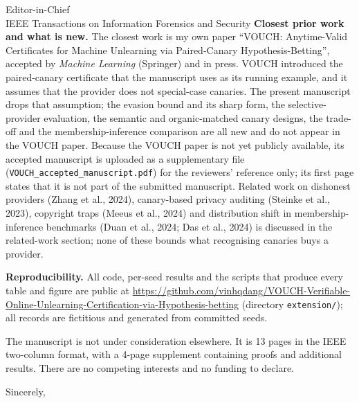 \documentclass[11pt]{letter}
\begin{document}
\begin{letter}{Editor-in-Chief\\IEEE Transactions on Information Forensics and Security}
\textbf{Closest prior work and what is new.} The closest work is my own paper
``VOUCH: Anytime-Valid Certificates for Machine Unlearning via Paired-Canary
Hypothesis-Betting'', accepted by \emph{Machine Learning} (Springer) and in press. VOUCH
introduced the paired-canary certificate that the manuscript uses as its running example,
and it assumes that the provider does not special-case canaries. The present manuscript drops
that assumption; the evasion bound and its sharp form, the selective-provider evaluation, the
semantic and organic-matched canary designs, the trade-off and the membership-inference
comparison are all new and do not appear in the VOUCH paper. Because the VOUCH paper is not
yet publicly available, its accepted manuscript is uploaded as a supplementary file
(\texttt{VOUCH\_accepted\_manuscript.pdf}) for the reviewers' reference only; its first page
states that it is not part of the submitted manuscript. Related work on dishonest providers (Zhang et al., 2024), canary-based
privacy auditing (Steinke et al., 2023), copyright traps (Meeus et al., 2024) and
distribution shift in membership-inference benchmarks (Duan et al., 2024; Das et al., 2024)
is discussed in the related-work section; none of these bounds what recognising canaries buys a provider.

\textbf{Reproducibility.} All code, per-seed results and the scripts that produce every
table and figure are public at
\url{https://github.com/vinhqdang/VOUCH-Verifiable-Online-Unlearning-Certification-via-Hypothesis-betting}
(directory \texttt{extension/}); all records are fictitious and generated from committed
seeds.

The manuscript is not under consideration elsewhere.
It is 13 pages in the IEEE two-column format, with a 4-page supplement containing proofs and
additional results. There are no competing interests and no funding to declare.

\closing{Sincerely,}
\end{letter}
\end{document}
